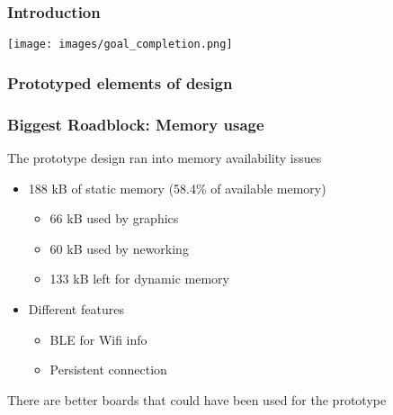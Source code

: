 \documentclass{beamer}
\begin{document}
\frame{\titlepage}

\begin{frame}
  \frametitle{Introduction}
  \begin{quote}{}
    
  \end{quote}

  \texttt{[image: images/goal\_completion.png]}
\end{frame}

\begin{frame}
  \frametitle{Prototyped elements of design}
\end{frame}

\begin{frame}
  \frametitle{Biggest Roadblock: Memory usage}

  The prototype design ran into memory availability issues
  \begin{itemize}
    \item 188 kB of static memory (58.4\% of available memory)
    \begin{itemize}
      \item 66 kB used by graphics
      \item 60 kB used by neworking
      \item 133 kB left for dynamic memory
    \end{itemize}
    \item Different features
    \begin{itemize}
      \item BLE for Wifi info
      \item Persistent connection
    \end{itemize}
  \end{itemize}
  There are better boards that could have been used for the prototype


\end{frame}
\end{document}
